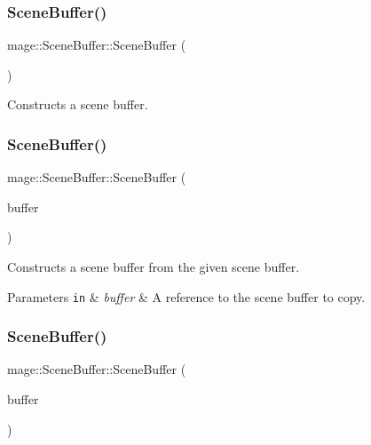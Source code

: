 \subsubsection{\texorpdfstring{Scene\+Buffer()}{SceneBuffer()}\hspace{0.1cm}{\footnotesize\ttfamily [1/3]}}
{\footnotesize\ttfamily mage\+::\+Scene\+Buffer\+::\+Scene\+Buffer (\begin{DoxyParamCaption}{ }\end{DoxyParamCaption})}

Constructs a scene buffer. \hypertarget{structmage_1_1_scene_buffer_aa77aa7851d2183259961c100705d0f3a}{}\label{structmage_1_1_scene_buffer_aa77aa7851d2183259961c100705d0f3a} 
\subsubsection{\texorpdfstring{Scene\+Buffer()}{SceneBuffer()}\hspace{0.1cm}{\footnotesize\ttfamily [2/3]}}
{\footnotesize\ttfamily mage\+::\+Scene\+Buffer\+::\+Scene\+Buffer (\begin{DoxyParamCaption}\item[{const \hyperlink{structmage_1_1_scene_buffer}{Scene\+Buffer} \&}]{buffer }\end{DoxyParamCaption})\hspace{0.3cm}{\ttfamily [default]}}

Constructs a scene buffer from the given scene buffer.


\begin{DoxyParams}[1]{Parameters}
\mbox{\tt in}  & {\em buffer} & A reference to the scene buffer to copy. \\
\hline
\end{DoxyParams}
\hypertarget{structmage_1_1_scene_buffer_ac0ae946e6dae445259a0bc19cd042a08}{}\label{structmage_1_1_scene_buffer_ac0ae946e6dae445259a0bc19cd042a08} 
\subsubsection{\texorpdfstring{Scene\+Buffer()}{SceneBuffer()}\hspace{0.1cm}{\footnotesize\ttfamily [3/3]}}
{\footnotesize\ttfamily mage\+::\+Scene\+Buffer\+::\+Scene\+Buffer (\begin{DoxyParamCaption}\item[{\hyperlink{structmage_1_1_scene_buffer}{Scene\+Buffer} \&\&}]{buffer }\end{DoxyParamCaption})\hspace{0.3cm}{\ttfamily [default]}}

